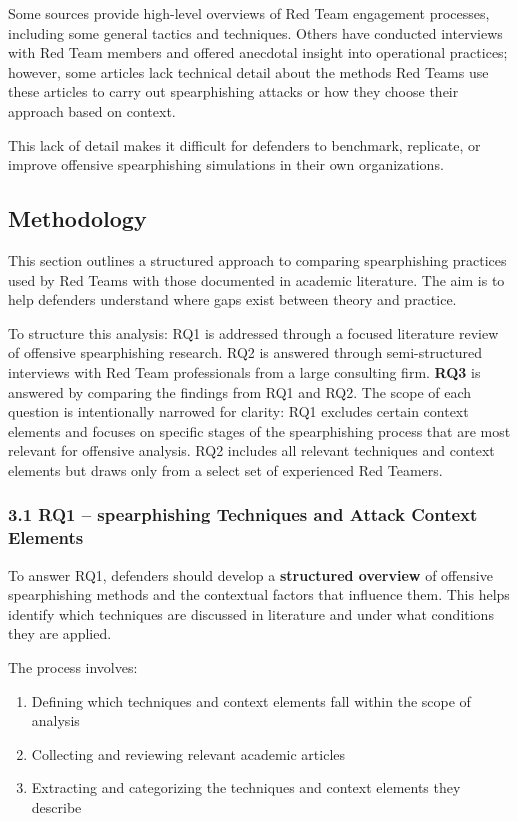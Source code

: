 Some sources provide high-level overviews of Red Team engagement processes, including some general tactics and techniques. Others have conducted interviews with Red Team members and offered anecdotal insight into operational practices; however, some articles lack technical detail about the methods Red Teams use these articles to carry out spearphishing attacks or how they choose their approach based on context.

This lack of detail makes it difficult for defenders to benchmark, replicate, or improve offensive spearphishing simulations in their own organizations.

\subsection{Methodology}

This section outlines a structured approach to comparing spearphishing practices used by Red Teams with those documented in academic literature. The aim is to help defenders understand where gaps exist between theory and practice.

To structure this analysis:
RQ1 is addressed through a focused literature review of offensive spearphishing research.
RQ2 is answered through semi-structured interviews with Red Team professionals from a large consulting firm.
\textbf{RQ3} is answered by comparing the findings from RQ1 and RQ2.
The scope of each question is intentionally narrowed for clarity:
RQ1 excludes certain context elements and focuses on specific stages of the spearphishing process that are most relevant for offensive analysis.
RQ2 includes all relevant techniques and context elements but draws only from a select set of experienced Red Teamers.


\subsubsection{3.1 RQ1 – spearphishing Techniques and Attack Context Elements}

To answer RQ1, defenders should develop a \textbf{structured overview} of offensive spearphishing methods and the contextual factors that influence them. This helps identify which techniques are discussed in literature and under what conditions they are applied.

The process involves:

\begin{enumerate}
    \item Defining which techniques and context elements fall within the scope of analysis
    \item Collecting and reviewing relevant academic articles
    \item Extracting and categorizing the techniques and context elements they describe
\end{enumerate}


